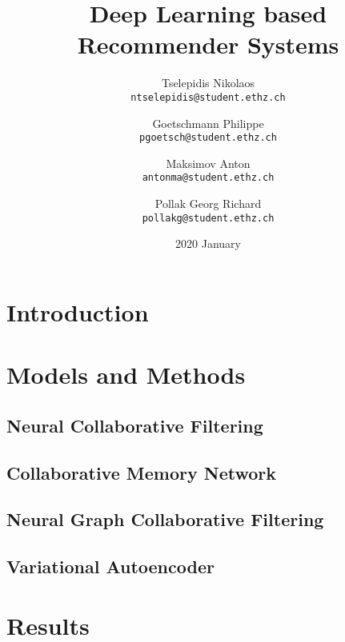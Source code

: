 \documentclass[
  twoColumns,
  fontsize=10pt,
  baseClass=extarticle
]{formularyETH/formularyETH}
\title{Deep Learning based Recommender Systems}
\author{
Tselepidis Nikolaos \\
\small{\texttt{ntselepidis@student.ethz.ch}}
    \and
Goetschmann Philippe \\
\small{\texttt{pgoetsch@student.ethz.ch}}
    \and
Maksimov Anton \\
\small{\texttt{antonma@student.ethz.ch}}
    \and
Pollak Georg Richard \\
\small{\texttt{pollakg@student.ethz.ch}}
}
\date{2020 January}
\begin{document}
\twocolumn[{%
  \begin{@twocolumnfalse} 
  \centering
  \maketitle
  \begin{abstract}
    
  \end{abstract}
  \end{@twocolumnfalse}
}]

\section*{Introduction}\label{sec:introduction}

\section*{Models and Methods}\label{sec:models_and_methods}
\subsection*{Neural Collaborative Filtering}\label{subsec:neural_collaborative_filtering}

\subsection*{Collaborative Memory Network}\label{subsec:collaborative_memory_network}

\subsection*{Neural Graph Collaborative Filtering}\label{subsec:neural_graph_collaborative_filtering}

\subsection*{Variational Autoencoder}\label{subsec:variational_autoencoder}


\section*{Results}\label{sec:results}

\end{document}
